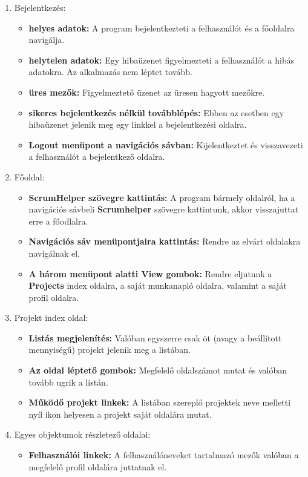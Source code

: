 \begin{enumerate}
	\item Bejelentkezés: 
	\begin{itemize}
		\item \textbf{helyes adatok:} A program bejelentkezteti a felhasználót és a főoldalra navigálja.
		\item \textbf{helytelen adatok:} Egy hibaüzenet figyelmezteti a felhasználót a hibás adatokra. Az alkalmazás nem léptet tovább.
		\item \textbf{üres mezők:} Figyelmeztető üzenet az üresen hagyott mezőkre.
		\item \textbf{sikeres bejelentkezés nélkül továbblépés:} Ebben az esetben egy hibaüzenet jelenik meg egy linkkel a bejelentkezési oldalra.
		\item \textbf{Logout menüpont a navigációs sávban:} Kijelentkeztet és visszavezeti a felhasználót a bejelentkező oldalra.
	\end{itemize}
	\item Főoldal:
	\begin{itemize}
		\item \textbf{ScrumHelper szövegre kattintás:} A program bármely oldalról, ha a navigációs sávbeli \textbf{Scrumhelper} szövegre kattintunk, akkor visszajuttat erre a főodlalra.
		\item \textbf{Navigációs sáv menüpontjaira kattintás:} Rendre az elvárt oldalakra navigálnak el.
		\item \textbf{A három menüpont alatti View gombok:} Rendre eljutunk a \textbf{Projects} index oldalra, a saját munkanapló oldalra, valamint a saját profil oldalra.
	\end{itemize}
	\item Projekt index oldal:
	\begin{itemize}
		\item \textbf{Listás megjelenítés:} Valóban egyszerre csak öt (avagy a beállított mennyiségű) projekt jelenik meg a listában.
		\item \textbf{Az oldal léptető gombok:} Megfelelő oldalszámot mutat és valóban tovább ugrik a listán.
		\item \textbf{Működő projekt linkek:} A listában szereplő projektek neve melletti nyíl ikon helyesen a projekt saját oldalára mutat.
	\end{itemize}
	\item Egyes objektumok részletező oldalai:
	\begin{itemize}
		\item \textbf{Felhasználói linkek:} A felhasználóneveket tartalmazó mezők valóban a megfelelő profil oldalára juttatnak el.

\end{itemize}
\end{enumerate}
